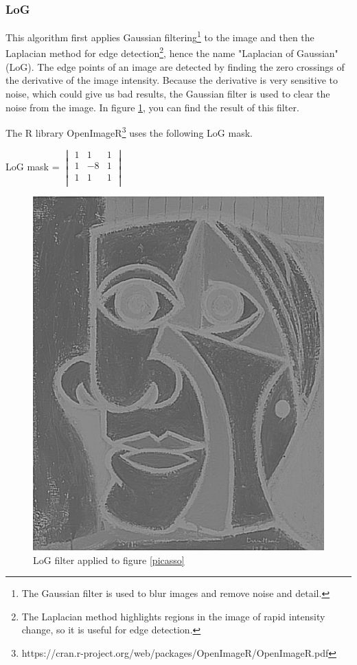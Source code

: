 \documentclass[12pt]{article}
\begin{document}
\subsubsection{LoG}
This algorithm first applies Gaussian filtering\footnote{The Gaussian filter is used to blur images and remove noise and detail.} to the image and then the Laplacian method for edge detection\footnote{The Laplacian method highlights regions in the image of rapid intensity change, so it is useful for edge detection.}, hence the name "Laplacian of Gaussian" (LoG).
The edge points of an image are detected by finding the zero crossings of the  derivative of the image intensity. Because the  derivative is very sensitive to noise, which could give us bad results, the Gaussian filter is used to clear the noise from the image. In figure \ref{log}, you can find the result of this filter.
\newline

The R library OpenImageR\footnote{https://cran.r-project.org/web/packages/OpenImageR/OpenImageR.pdf} uses the following LoG mask.
\newline

LoG mask = $\begin{vmatrix}
        1 & 1 & 1\\
        1 & -8 & 1\\
        1 & 1 & 1\\
\end{vmatrix}$

\begin{figure}[h]
\centering
\includegraphics[scale = 0.39]{img/picassoLoG}
\caption{LoG filter applied to figure \ref{picasso}}
\label{log}
\end{figure}
\end{document}
